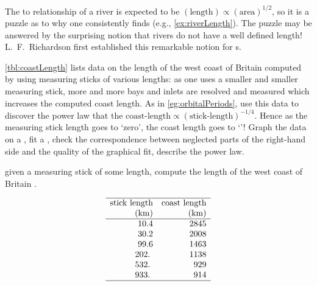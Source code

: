 \begin{exercise} \label{ex:coastlength} 
The  to  relationship of a river is expected to be \((\text{length})\propto(\text{area})^{1/2}\), so it is a puzzle as to why one consistently finds  (e.g., \cref{ex:riverLength}).
The puzzle may be answered by the surprising notion that rivers do not have a well defined length!
L.~F.~Richardson first established this remarkable notion for s.

\cref{tbl:coastLength} lists data on the length of the west coast of Britain computed by using measuring sticks of various lengths: as one uses a smaller and smaller measuring stick, more and more bays and inlets are resolved and measured which increases the computed coast length. 
\setbox\ajrqrbox\hbox{}%
\marginajrbox%
As in \cref{eg:orbitalPeriods}, use this data to discover the power law that the \(\text{coast-length}\propto(\text{stick-length})^{-1/4}\).
Hence as the measuring stick length goes to `zero', the coast length goes to `'!  
Graph the data on a , fit a , check the correspondence between neglected parts of the right-hand side and the quality of the graphical fit, describe the power law.
\begin{table}
\caption{given a measuring stick of some length, compute the length of the west coast of Britain \cite[Plate~33]{Mandelbrot1982}.}
\label{tbl:coastLength}
\begin{equation*}
\begin{array}{rr} \hline
\text{stick length}&\text{coast length}\\
(\text{km})&\text{(km)}\\\hline
     10.4 & 2845 \\
     30.2 & 2008 \\
     99.6 & 1463 \\
    202.\ & 1138 \\
    532.\ &  929 \\
    933.\ &  914 \\
\hline
\end{array}
\end{equation*}
\end{table}%
\end{exercise}




